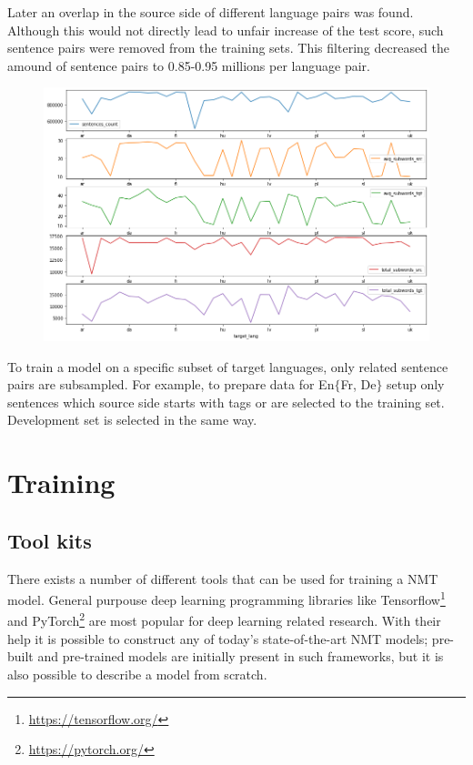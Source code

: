 Later an overlap in the source side of different language pairs was found.
Although this would not directly lead to unfair increase of the test score,
such sentence pairs were removed from the training sets.
This filtering decreased the amound of sentence pairs
to 0.85-0.95 millions per language pair.

\begin{figure}[h]
	\centering
	\includegraphics[width=0.9\columnwidth]{../img/train_set_statistics.png}
	\label{fig:language_statistics}
\end{figure}


To train a model on a specific subset of target languages, only related sentence
pairs are subsampled.
For example, to prepare data for En\to{}$\{$Fr, De$\}$ setup only sentences which source
side starts with tags  or  are selected to the training set.
Development set is selected in the same way.


\section{Training}

\subsection{Tool kits}

There exists a number of different tools that can be used for training a NMT model.
General purpouse deep learning programming libraries like
Tensorflow\footnote{\url{https://tensorflow.org/}} and
PyTorch\footnote{\url{https://pytorch.org/}} are most popular for deep learning related
research. With their help it is possible to construct any of today's state-of-the-art
NMT models; pre-built and pre-trained models are initially present in such frameworks,
but it is also possible to describe a model from scratch.

